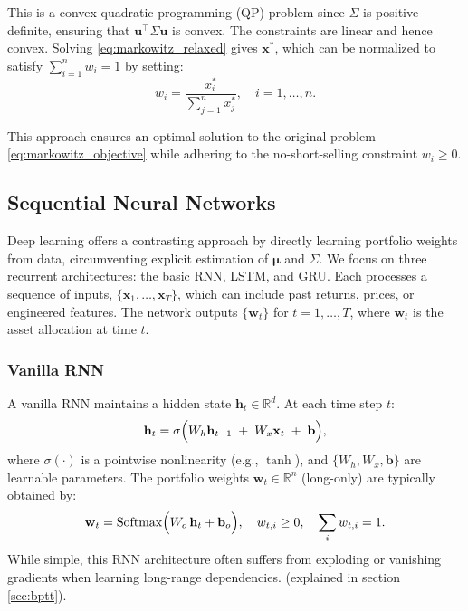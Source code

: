 \documentclass[11pt]{article}
\begin{document}
This is a convex quadratic programming (QP) problem since \(\Sigma\) is positive definite, ensuring that \(\mathbf{u}^{\top} \Sigma \mathbf{u}\) is convex. The constraints are linear and hence convex. Solving \eqref{eq:markowitz_relaxed} gives \(\mathbf{x}^*\), which can be normalized to satisfy \(\sum_{i=1}^n w_i = 1\) by setting:
\[
    w_i = \frac{x_i^*}{\sum_{j=1}^n x_j^*}, \quad i = 1, \dots, n.
\]

This approach ensures an optimal solution to the original problem \eqref{eq:markowitz_objective} while adhering to the no-short-selling constraint \(w_i \geq 0\).



\subsection{Sequential Neural Networks}

Deep learning offers a contrasting approach by directly learning portfolio weights from data, circumventing explicit estimation of \(\boldsymbol{\mu}\) and \(\Sigma\). We focus on three recurrent architectures: the basic RNN, LSTM, and GRU. Each processes a sequence of inputs, \(\{\mathbf{x}_1, \dots, \mathbf{x}_T\}\), which can include past returns, prices, or engineered features. The network outputs \(\{\mathbf{w}_t\}\) for \(t=1,\dots,T\), where \(\mathbf{w}_t\) is the asset allocation at time \(t\).

\subsubsection{Vanilla RNN}
A vanilla RNN maintains a hidden state \(\mathbf{h}_t \in \mathbb{R}^d\). At each time step \(t\):
\begin{equation}\label{eq:rnn_simple}
    \mathbf{h}_t 
    = \sigma\Bigl(W_h \mathbf{h}_{t-1} \;+\; W_x \mathbf{x}_t \;+\; \mathbf{b}\Bigr),
\end{equation}
where \(\sigma(\cdot)\) is a pointwise nonlinearity (e.g., \(\tanh\)), and \(\{W_h, W_x, \mathbf{b}\}\) are learnable parameters. The portfolio weights \(\mathbf{w}_t \in \mathbb{R}^n\) (long-only) are typically obtained by:
\[
    \mathbf{w}_t
    = \mathrm{Softmax}\Bigl(W_o\,\mathbf{h}_t + \mathbf{b}_o\Bigr),
    \quad
    w_{t,i} \ge 0, \quad \sum_i w_{t,i} = 1.
\]
While simple, this RNN architecture often suffers from exploding or vanishing gradients when learning long-range dependencies. (explained in section \ref{sec:bptt}).
\end{document}
